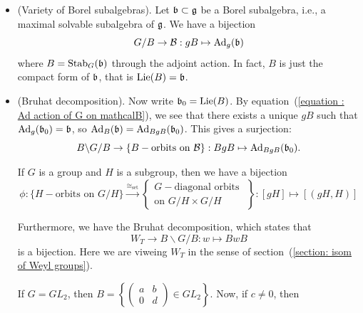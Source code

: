 \begin{itemize}
    \item(Variety of Borel subalgebras). Let $\mathfrak{b}\subset \mathfrak{g}$ be a Borel subalgebra, i.e., a maximal 
    solvable subalgebra of $\mathfrak{g}$. We have a bijection
    \begin{equation}\label{equation : Ad action of G on mathcalB}
        G/B \to \mathcal{B}: gB \mapsto \text{Ad}_g(\mathfrak{b})
    \end{equation} 
    where $B=\text{Stab}_G(\mathfrak{b})$ through the adjoint action. In fact, $B$ is just the compact form of $\mathfrak{b}$, that is 
    $\text{Lie}(B)=\mathfrak{b}$.
    \item(Bruhat decomposition). Now write $\mathfrak{b}_0=\text{Lie}(B)$. 
    By equation~(\ref{equation : Ad action of G on mathcalB}), we see that there exists a unique 
    $gB$ such that $\text{Ad}_g(\mathfrak{b}_0)=\mathfrak{b}$, so $\text{Ad}_B(\mathfrak{b})=\text{Ad}_{BgB}(\mathfrak{b}_0)$. This gives a surjection:
    \begin{equation}\label{equation : first map}
        B\backslash G/B \rightarrow\{B-\text{orbits on }\mathcal{B}\}:BgB\mapsto \text{Ad}_{BgB}(\mathfrak{b}_0).
    \end{equation} 
    \begin{remark}
        If $G$ is a group and $H$ is a subgroup, then we have a bijection
        \begin{equation}\label{equation : second map}
            \phi:\{H-\text{orbits on }G/H\}\overset{\cong_{\text{set}}}{\rightarrow}
            \left\{\begin{matrix}G-\text{diagonal orbits }\\\text{on }G/H\times G/H\end{matrix}\right\}:
            [gH]\mapsto [(gH,H)]
        \end{equation}
    \end{remark}
    Furthermore, we have the Bruhat decomposition, which states that 
    \begin{equation}\label{equation : Bruhat decomposition}
        W_T \rightarrow B\backslash G/B: w \mapsto BwB
    \end{equation}
    is a bijection. Here we are viweing $W_T$ in the sense of section~(\ref{section: isom of Weyl groups}).
    \begin{example}
        If $G=GL_2$, then $B=\left\{\begin{pmatrix}a&b\\0&d\end{pmatrix}\in GL_2\right\}$. Now, if $c\neq0$, then 
        \begin{equation}

\end{equation}
\end{example}
\end{itemize}
